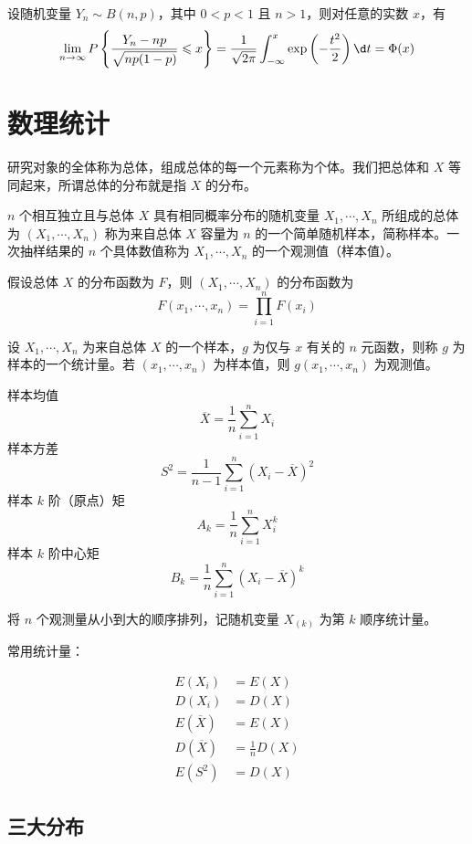 \begin{theorem}
	设随机变量 $Y_n \sim B(n, p)$，其中 $0 < p < 1$ 且 $n > 1$，则对任意的实数 $x$，有
	\[ \lim_{n \to \infty} P\left\{ \frac{Y_n - np}{\sqrt{np(1 - p)}} \leqslant x \right\} = \frac{1}{\sqrt{2 \pi}} \int_{-\infty}^x \exp\left(-\frac{t^2}{2}\right) \d t = \Phi(x)  \]
\end{theorem}

\section{数理统计}

研究对象的全体称为总体，组成总体的每一个元素称为个体。我们把总体和 $X$ 等同起来，所谓总体的分布就是指 $X$ 的分布。

$n$ 个相互独立且与总体 $X$ 具有相同概率分布的随机变量 $X_1, \cdots, X_n$ 所组成的总体为 $(X_1, \cdots, X_n)$ 称为来自总体 $X$ 容量为 $n$ 的一个简单随机样本，简称样本。一次抽样结果的 $n$ 个具体数值称为 $X_1, \cdots, X_n$ 的一个观测值（样本值）。

假设总体 $X$ 的分布函数为 $F$，则 $(X_1, \cdots, X_n)$ 的分布函数为
\[ F(x_1, \cdots, x_n) = \prod_{i=1}^n F(x_i) \]

设 $X_1, \cdots, X_n$ 为来自总体 $X$ 的一个样本，$g$ 为仅与 $x$ 有关的 $n$ 元函数，则称 $g$ 为样本的一个统计量。若 $(x_1, \cdots, x_n)$ 为样本值，则 $g(x_1, \cdots, x_n)$ 为观测值。

样本均值
\[ \overline{X} = \frac{1}{n} \sum_{i=1}^n X_i \]
样本方差
\[ S^2 = \frac{1}{n-1} \sum_{i=1}^n (X_i - \overline{X})^2 \]
样本 $k$ 阶（原点）矩
\[ A_k = \frac{1}{n} \sum_{i=1}^n X_i^k \]
样本 $k$ 阶中心矩
\[ B_k = \frac{1}{n} \sum_{i=1}^n (X_i - \overline{X})^k \]

将 $n$ 个观测量从小到大的顺序排列，记随机变量 $X_{(k)}$ 为第 $k$ 顺序统计量。

常用统计量：

\[
	\begin{aligned}
		E(X_i)          & = E(X)             \\
		D(X_i)          & = D(X)             \\
		E(\overline{X}) & = E(X)             \\
		D(\overline{X}) & = \frac{1}{n} D(X) \\
		E(S^2)          & = D(X)
	\end{aligned}
\]

\subsection{三大分布}

